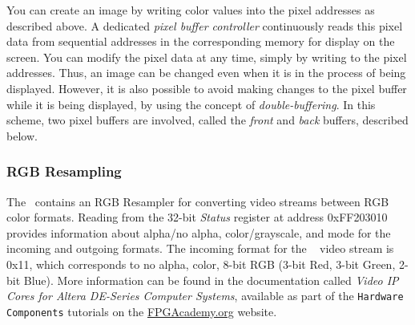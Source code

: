 You can create an image by writing color values into the pixel addresses as described
above. A dedicated {\it pixel buffer controller} continuously reads this pixel 
data from sequential addresses in the corresponding
memory for display on the screen.  You can modify the pixel data at any time, simply
by writing to the pixel addresses. Thus, an image can be changed even when it is in the
process of being displayed.  However, it is also possible to avoid making changes to 
the pixel buffer while it is being displayed, by using the concept of {\it
double-buffering}.  In this scheme, two pixel buffers are involved, called the {\it front} 
and {\it back} buffers, described below.

\subsubsection{RGB Resampling}
The \systemName~contains an RGB Resampler for converting video streams between RGB color 
formats. Reading from the 32-bit \textit{Status} register at address {\sf 0xFF203010} 
provides information about alpha/no alpha, color/grayscale, and mode for the incoming and 
outgoing formats. The incoming format for the \systemName~ video stream is {\sf 0x11}, 
which corresponds to no alpha, color, 8-bit RGB (3-bit Red, 3-bit Green, 2-bit Blue). 
More information can be found in the documentation called 
{\it Video IP Cores for Altera DE-Series Computer Systems}, available as part of the
\texttt{Hardware Components} tutorials on the 
{\small \href{https://www.fpgacademy.org/tutorials.html} {FPGAcademy.org}} website.


